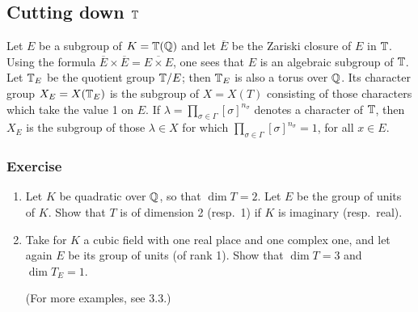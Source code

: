 \subsection{Cutting down $\mathbb{T}$}
\label{sec:II_12}
Let $E$ be a subgroup of $K = \mathbb{T}(\mathbb{Q})$ and let $\overline{E}$ be the Zariski
closure of $E$ in $\mathbb{T}$. Using the formula $\overline{E} \times \overline{E} =
\overline{E \times E}$, one sees that $E$ is an algebraic subgroup of $\mathbb{T}$.
Let $\mathbb{T}_E$ be the quotient group $\mathbb{T}/E$; then $\mathbb{T}_E$ is also a torus over
$\mathbb{Q}$. Its character group $X_E = X(\mathbb{T}_E)$ is the subgroup of $X = X(T)$
consisting of those characters which take the value 1 on $E$.
If $\lambda = \prod_{\sigma \in \Gamma} [\sigma]^{n_\sigma}$ denotes a
character of $\mathbb{T}$, then $X_E$ is the subgroup of those $\lambda \in X$ for 
which
$\prod_{\sigma \in \Gamma} [\sigma]^{n_\sigma} = 1$, for all $x \in E$.

\subsubsection*{Exercise}
\begin{enumerate}[label=\textit{\alph*}.]
\item Let $K$ be quadratic over $\mathbb{Q}$, so that $\dim T = 2$. Let $E$ be the
	group of units of $K$. Show that $T$ is of dimension 2 (resp.\ 1) if
	$K$ is imaginary (resp.\ real).
\item Take for $K$ a cubic field with one real place and one complex one, and
	let again $E$ be its group of units (of rank 1). Show that $\dim T = 3$
	and $\dim T_E = 1$.

	(For more examples, see 3.3.)\dpage
\end{enumerate}

